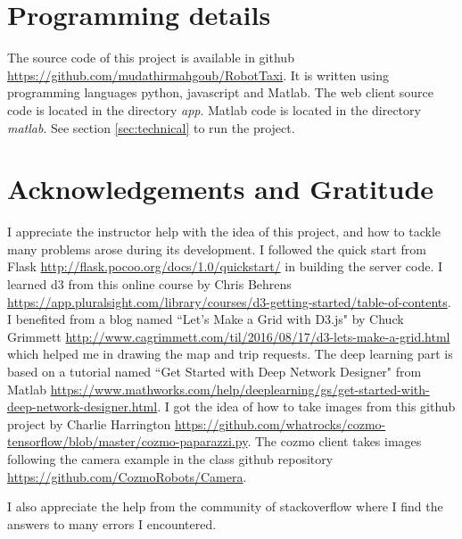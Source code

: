 \documentclass[12pt,a4paper]{article}
\begin{document}
\section{Programming details}

The source code of this project is available in github \url{https://github.com/mudathirmahgoub/RobotTaxi}. It is written using programming languages python, javascript and Matlab. The web client source code is located in the directory \textit{app}. Matlab code is located in the directory \textit{matlab}. 
See section \ref{sec:technical} to run the project. 

\section{Acknowledgements and Gratitude}

I appreciate the instructor help  with the idea of this project, and how to tackle many problems arose during its development. I followed the quick start from Flask \url{http://flask.pocoo.org/docs/1.0/quickstart/} in building the server code. I learned d3 from this online course by Chris Behrens \\ \url{https://app.pluralsight.com/library/courses/d3-getting-started/table-of-contents}. I benefited  from a blog named ``Let's Make a Grid with D3.js" by Chuck Grimmett \url{http://www.cagrimmett.com/til/2016/08/17/d3-lets-make-a-grid.html} which helped me in drawing the map and trip requests. The deep learning part is based on a tutorial named ``Get Started with Deep Network Designer" from Matlab \url{https://www.mathworks.com/help/deeplearning/gs/get-started-with-deep-network-designer.html}. I got the idea of how to take images from this github project by Charlie Harrington \url{https://github.com/whatrocks/cozmo-tensorflow/blob/master/cozmo-paparazzi.py}. The cozmo client takes images following the camera example in the class github repository \url{https://github.com/CozmoRobots/Camera}. 

I also appreciate the help from the community of stackoverflow where I find the answers to many errors I encountered. 





\end{document}
